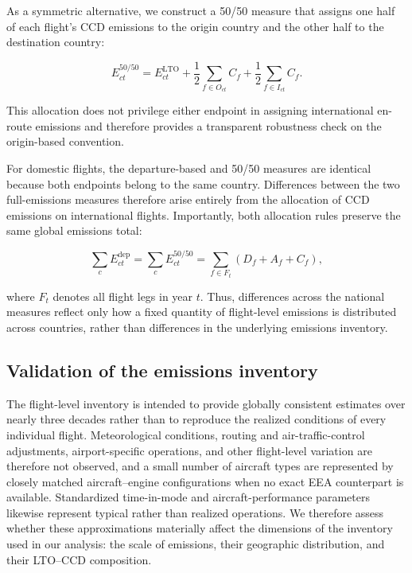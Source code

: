 \documentclass[12pt]{extarticle}
\begin{document}
As a symmetric alternative, we construct a 50/50 measure that assigns one half of each flight's CCD emissions to the origin country and the other half to the destination country:

\begin{equation}
E^{50/50}_{ct}
=
E^{\mathrm{LTO}}_{ct}
+
\frac{1}{2}\sum_{f\in O_{ct}} C_f
+
\frac{1}{2}\sum_{f\in I_{ct}} C_f .
\label{eq:nature_7}
\end{equation}

This allocation does not privilege either endpoint in assigning international en-route emissions and therefore provides a transparent robustness check on the origin-based convention.

For domestic flights, the departure-based and 50/50 measures are identical because both endpoints belong to the same country. Differences between the two full-emissions measures therefore arise entirely from the allocation of CCD emissions on international flights. Importantly, both allocation rules preserve the same global emissions total:

\begin{equation}
\sum_c E^{\mathrm{dep}}_{ct}
=
\sum_c E^{50/50}_{ct}
=
\sum_{f\in F_t}
\left(D_f+A_f+C_f\right),
\label{eq:nature_8}
\end{equation}

where $F_t$ denotes all flight legs in year $t$. Thus, differences across the national measures reflect only how a fixed quantity of flight-level emissions is distributed across countries, rather than differences in the underlying emissions inventory.

\subsection*{Validation of the emissions inventory}

The flight-level inventory is intended to provide globally consistent estimates over nearly three decades rather than to reproduce the realized conditions of every individual flight. Meteorological conditions, routing and air-traffic-control adjustments, airport-specific operations, and other flight-level variation are therefore not observed, and a small number of aircraft types are represented by closely matched aircraft--engine configurations when no exact EEA counterpart is available. Standardized time-in-mode and aircraft-performance parameters likewise represent typical rather than realized operations. We therefore assess whether these approximations materially affect the dimensions of the inventory used in our analysis: the scale of emissions, their geographic distribution, and their LTO--CCD composition.
\end{document}
